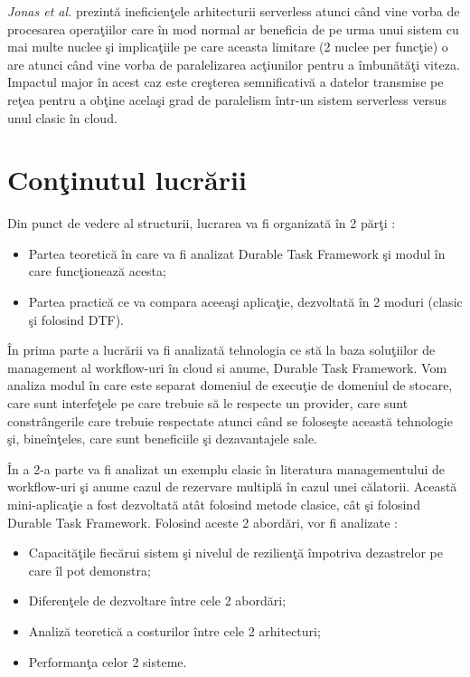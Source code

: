 \par\emph{Jonas et al.} \cite{jonas2019} prezintă ineficienţele arhitecturii serverless atunci când vine vorba de procesarea operaţiilor care în mod normal ar beneficia de pe urma unui sistem cu mai multe nuclee şi implicaţiile pe care aceasta limitare (2 nuclee per funcţie) o are atunci când vine vorba de paralelizarea acţiunilor pentru a îmbunătăţi viteza. Impactul major în acest caz este creşterea semnificativă a datelor transmise pe reţea pentru a obţine acelaşi grad de paralelism într-un sistem serverless versus unul clasic în cloud. 


\section{Conţinutul lucrării}
 Din punct de vedere al structurii, lucrarea va fi organizată în 2 părţi :
\begin{itemize}
\item Partea teoretică în care va fi analizat Durable Task Framework şi modul în care funcţionează acesta;
\item Partea practică ce va compara aceeaşi aplicaţie, dezvoltată în 2 moduri (clasic şi folosind DTF).
\end{itemize}
\par În prima parte a lucrării va fi analizată tehnologia ce stă la baza soluţiilor de management al workflow-uri în cloud si anume, Durable Task Framework. Vom analiza modul în care este separat domeniul de execuţie de domeniul de stocare, care sunt interfeţele pe care trebuie să le respecte un provider, care sunt constrângerile care trebuie respectate atunci când se foloseşte această tehnologie şi, bineînţeles, care sunt beneficiile şi dezavantajele sale. 
\par În a 2-a parte va fi analizat un exemplu clasic în literatura managementului de workflow-uri şi anume cazul de rezervare multiplă în cazul unei călatorii. Această mini-aplicaţie a fost dezvoltată atât folosind metode clasice, cât şi folosind Durable Task Framework. Folosind aceste 2 abordări, vor fi analizate : 
\begin{itemize}
\item Capacităţile fiecărui sistem şi nivelul de rezilienţă împotriva dezastrelor pe care îl pot demonstra;
\item Diferenţele de dezvoltare între cele 2 abordări;
\item Analiză teoretică a costurilor între cele 2 arhitecturi; 
\item Performanţa celor 2 sisteme.
\end{itemize}
